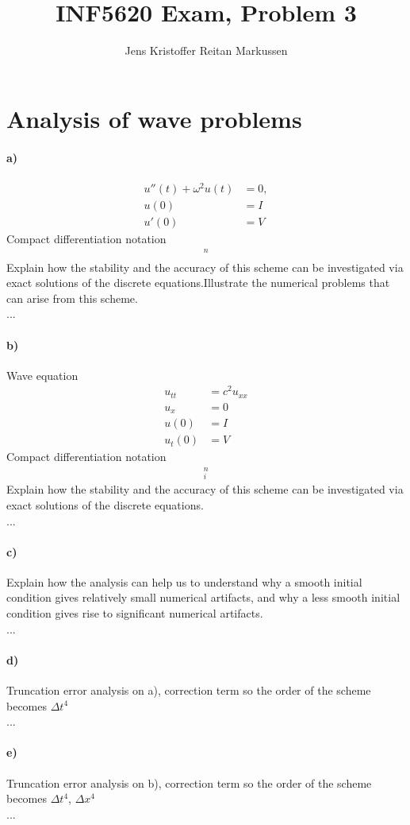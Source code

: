 \documentclass[11pt,a4paper]{article}
\author{Jens Kristoffer Reitan Markussen}
\title{INF5620 Exam, Problem 3}
\begin{document}
\maketitle
\section*{Analysis of wave problems}
\paragraph*{a)}
\begin{align}
u''(t) + \omega^2u(t)&=0,\\
u(0) &= I\\
u'(0) &= V 
\end{align}
Compact differentiation notation
\begin{align*}
[D_tD_tu+\omega^2u(t)=0]^n
\end{align*}
Explain how the stability and the accuracy of this scheme can be investigated via exact solutions of the discrete equations.Illustrate the numerical problems that can arise from this scheme. \\

...

\paragraph*{b)}
Wave equation
\begin{align}
u_{tt} &= c^2u_{xx}\\
u_{x} &= 0\\
u(0) &= I\\
u_{t}(0) &= V 
\end{align}
Compact differentiation notation
\begin{align*}
[D_tD_tu=c^2D_xD_x]^n_i
\end{align*}
Explain how the stability and the accuracy of this scheme can be investigated via exact solutions of the discrete equations. \\

...

\paragraph*{c)}
Explain how the analysis can help us to understand why a smooth initial condition gives relatively small numerical artifacts, and why a less smooth initial condition gives rise to significant numerical artifacts. \\

...

\paragraph*{d)}
Truncation error analysis on a), correction term so the order of the scheme becomes $\Delta t^4$ \\

...

\paragraph*{e)}
Truncation error analysis on b), correction term so the order of the scheme becomes $\Delta t^4$, $\Delta x^4$\\

...
\end{document}

